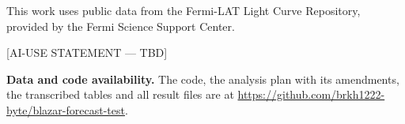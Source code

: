 \documentclass[twocolumn]{aastex631}
\begin{document}
\begin{acknowledgments}
This work uses public data from the Fermi-LAT Light Curve Repository, provided by the Fermi Science Support Center.

[AI-USE STATEMENT --- TBD]
\end{acknowledgments}

\noindent\textbf{Data and code availability.} The code, the analysis plan with its amendments, the transcribed tables and all result files are at \url{https://github.com/brkh1222-byte/blazar-forecast-test}. %


{}

\end{document}
